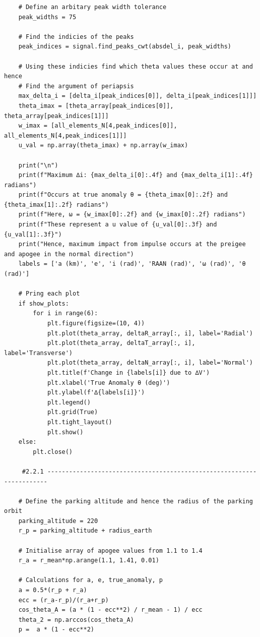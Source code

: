 \documentclass[12pt,twocolumn]{article}  %
\begin{document}
\begin{lstlisting}
    # Define an arbitary peak width tolerance
    peak_widths = 75
    
    # Find the indicies of the peaks 
    peak_indices = signal.find_peaks_cwt(absdel_i, peak_widths)
    
    # Using these indicies find which theta values these occur at and hence
    # Find the argument of periapsis
    max_delta_i = [delta_i[peak_indices[0]], delta_i[peak_indices[1]]]
    theta_imax = [theta_array[peak_indices[0]], theta_array[peak_indices[1]]]
    w_imax = [all_elements_N[4,peak_indices[0]], all_elements_N[4,peak_indices[1]]]
    u_val = np.array(theta_imax) + np.array(w_imax)
    
    print("\n")
    print(f"Maximum ∆i: {max_delta_i[0]:.4f} and {max_delta_i[1]:.4f} radians")
    print(f"Occurs at true anomaly θ = {theta_imax[0]:.2f} and {theta_imax[1]:.2f} radians")
    print(f"Here, ω = {w_imax[0]:.2f} and {w_imax[0]:.2f} radians")
    print(f"These represent a u value of {u_val[0]:.3f} and {u_val[1]:.3f}")
    print("Hence, maximum impact from impulse occurs at the preigee and apogee in the normal direction")
    labels = ['a (km)', 'e', 'i (rad)', 'RAAN (rad)', 'ω (rad)', 'θ (rad)']
    
    # Pring each plot
    if show_plots:
        for i in range(6):
            plt.figure(figsize=(10, 4))
            plt.plot(theta_array, deltaR_array[:, i], label='Radial')
            plt.plot(theta_array, deltaT_array[:, i], label='Transverse')
            plt.plot(theta_array, deltaN_array[:, i], label='Normal')
            plt.title(f'Change in {labels[i]} due to ∆V')
            plt.xlabel('True Anomaly θ (deg)')
            plt.ylabel(f'∆{labels[i]}')
            plt.legend()
            plt.grid(True)
            plt.tight_layout()
            plt.show()
    else:
        plt.close()   
                
     #2.2.1 ----------------------------------------------------------------------
     
    # Define the parking altitude and hence the radius of the parking orbit
    parking_altitude = 220
    r_p = parking_altitude + radius_earth
    
    # Initialise array of apogee values from 1.1 to 1.4
    r_a = r_mean*np.arange(1.1, 1.41, 0.01)
    
    # Calculations for a, e, true_anomaly, p
    a = 0.5*(r_p + r_a)
    ecc = (r_a-r_p)/(r_a+r_p)
    cos_theta_A = (a * (1 - ecc**2) / r_mean - 1) / ecc
    theta_2 = np.arccos(cos_theta_A)
    p =  a * (1 - ecc**2)
    

\end{lstlisting}
\end{document}
